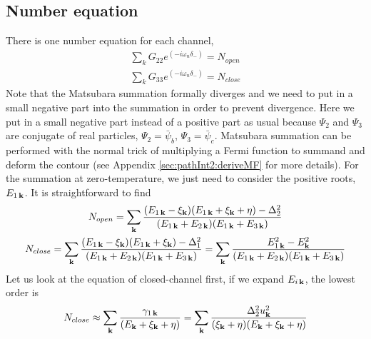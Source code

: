 \subsection{Number equation}
There is one  number equation for each channel,  
\begin{gather*}
\sum_{k}G_{22}e^{(-i\omega_n\delta_-)}=N_{open}\\
\sum_{k}G_{33}e^{(-i\omega_n\delta_-)}=N_{close}
\end{gather*}
Note that the Matsubara summation  formally diverges and we need to put in a small negative part into the summation in order to prevent divergence.  Here we put in a small  negative part instead of a positive part as usual  because $\Psi_{2}$ and $\Psi_{3}$ are conjugate of real particles, $\Psi_2=\bar\psi_b$, $\Psi_3=\bar\psi_c$.  Matsubara summation can be performed with the normal trick of multiplying a Fermi function to summand and deform the contour  (see Appendix \ref{sec:pathInt2:deriveMF} for more details).  For the summation at zero-temperature, we just need to consider the positive roots, $E_{1\,\mathbf{k}}$.  It is straightforward to find 
\begin{gather}
N_{open}=\sum_{\mathbf{k}}\frac{(E_{1\,\mathbf{k}}-\xi_{\mathbf{k}})(E_{1\,\mathbf{k}}+\xi_{\mathbf{k}}+\eta)-\Delta_2^2}{(E_{1\,\mathbf{k}}+E_{2\,\mathbf{k}})(E_{1\,\mathbf{k}}+E_{3\,\mathbf{k}})}
\label{eq:pathInt2:numOpen}\\
N_{close}=\sum_{\mathbf{k}}\frac{(E_{1\,\mathbf{k}}-\xi_{\mathbf{k}})(E_{1\,\mathbf{k}}+\xi_{\mathbf{k}})-\Delta_1^2}{(E_{1\,\mathbf{k}}+E_{2\,\mathbf{k}})(E_{1\,\mathbf{k}}+E_{3\,\mathbf{k}})}
=\sum_{\mathbf{k}}\frac{E_{1\,\mathbf{k}}^2-E_{\mathbf{k}}^2}{(E_{1\,\mathbf{k}}+E_{2\,\mathbf{k}})(E_{1\,\mathbf{k}}+E_{3\,\mathbf{k}})}\label{eq:pathInt2:numClose}
\end{gather}
Let us look at the equation of closed-channel first, if we expand $E_{i\,\mathbf{k}}$, the lowest order is 
\begin{equation}
N_{close}\approx\sum_{\mathbf{k}}\frac{\gamma_{1\,\mathbf{k}}}{(E_{\mathbf{k}}+\xi_{\mathbf{k}}+\eta)}=\sum_{\mathbf{k}}\frac{\Delta_{2}^2u_{\mathbf{k}}^{2}}{(\xi_{\mathbf{k}}+\eta)(E_{\mathbf{k}}+\xi_{\mathbf{k}}+\eta)}
\end{equation}
